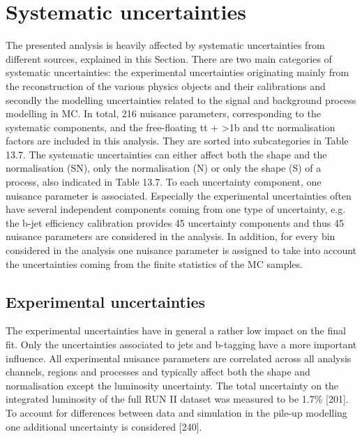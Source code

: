 \section{Systematic uncertainties}
The presented analysis is heavily affected by systematic uncertainties from different sources, explained in this Section. There are two main categories of systematic uncertainties: the experimental uncertainties originating mainly from the reconstruction of the various physics objects and their calibrations and secondly the modelling uncertainties related to the signal and background process modelling in MC. In total, 216 nuisance parameters, corresponding to the systematic components, and the free-floating tt + >1b and ttc normalisation factors are included in this analysis. They are sorted into subcategories in Table 13.7.
The systematic uncertainties can either affect both the shape and the normalisation (SN), only the normalisation (N) or only the shape (S) of a process, also indicated in Table 13.7.
To each uncertainty component, one nuisance parameter is associated. Especially the experimental uncertainties often have several independent components coming from one type of uncertainty, e.g. the b-jet efficiency calibration provides 45 uncertainty components and thus 45 nuisance parameters are considered in the analysis.
In addition, for every bin considered in the analysis one nuisance parameter is assigned to take into account the uncertainties coming from the finite statistics of the MC samples.


\subsection{Experimental uncertainties}
The experimental uncertainties have in general a rather low impact on the final fit. Only the uncertainties associated to jets and b-tagging have a more important influence. All experimental nuisance parameters are correlated across all analysis channels, regions and processes and typically affect both the shape and normalisation except the luminosity uncertainty.
The total uncertainty on the integrated luminosity of the full RUN II dataset was measured to be 1.7\% [201]. To account for differences between data and simulation in the pile-up modelling one additional uncertainty is considered [240].

